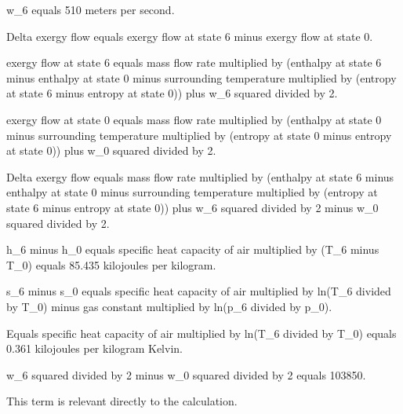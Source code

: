 w_6 equals 510 meters per second.  

Delta exergy flow equals exergy flow at state 6 minus exergy flow at state 0.  

exergy flow at state 6 equals mass flow rate multiplied by (enthalpy at state 6 minus enthalpy at state 0 minus surrounding temperature multiplied by (entropy at state 6 minus entropy at state 0)) plus w_6 squared divided by 2.  

exergy flow at state 0 equals mass flow rate multiplied by (enthalpy at state 0 minus surrounding temperature multiplied by (entropy at state 0 minus entropy at state 0)) plus w_0 squared divided by 2.  

Delta exergy flow equals mass flow rate multiplied by (enthalpy at state 6 minus enthalpy at state 0 minus surrounding temperature multiplied by (entropy at state 6 minus entropy at state 0)) plus w_6 squared divided by 2 minus w_0 squared divided by 2.  

h_6 minus h_0 equals specific heat capacity of air multiplied by (T_6 minus T_0) equals 85.435 kilojoules per kilogram.  

s_6 minus s_0 equals specific heat capacity of air multiplied by ln(T_6 divided by T_0) minus gas constant multiplied by ln(p_6 divided by p_0).  

Equals specific heat capacity of air multiplied by ln(T_6 divided by T_0) equals 0.361 kilojoules per kilogram Kelvin.  

w_6 squared divided by 2 minus w_0 squared divided by 2 equals 103850.  

This term is relevant directly to the calculation.